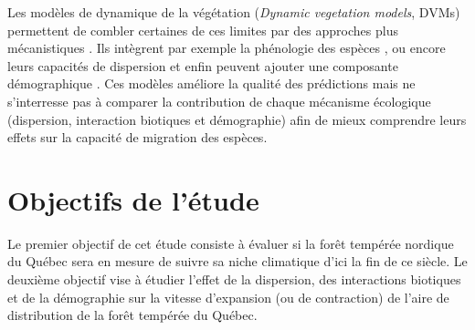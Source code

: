 Les modèles de dynamique de la végétation
(\textit{Dynamic vegetation models}, DVMs) permettent de combler certaines de ces limites par des
approches plus mécanistiques \citep{Snell2014a}. Ils intègrent par exemple la phénologie des espèces
\citep{Letters2001,Morin2008}, ou encore leurs capacités de dispersion \citep{Nobis2014,Iverson2004}
et enfin peuvent ajouter une composante démographique \citep{Lischke2006a,Vanderwel2014}. Ces
modèles améliore la qualité des prédictions mais ne s'interresse pas à comparer la
contribution de chaque mécanisme écologique (dispersion, interaction biotiques et démographie) afin
de mieux comprendre leurs effets sur la capacité de migration des espèces.

\section*{Objectifs de l'étude}

Le premier objectif de cet étude consiste à évaluer si la forêt tempérée nordique du Québec sera en
mesure de suivre sa niche climatique d'ici la fin de ce siècle. Le deuxième objectif vise à étudier
l'effet de la dispersion, des interactions biotiques et de la démographie sur la vitesse d'expansion
(ou de contraction) de l'aire de distribution de la forêt tempérée du Québec.

